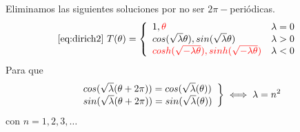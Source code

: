 \noindent Eliminamos las siguientes soluciones por no ser $2\pi-$periódicas.
\begin{equation*}
\eqref{eq:dirich2}\ T(\theta) = \left\{
\begin{array}{l l}
1,\color{red}{\theta} & \lambda=0\\
cos(\sqrt{\lambda}\theta), sin(\sqrt{\lambda}\theta) & \lambda > 0\\
\color{red}{cosh(\sqrt{-\lambda\theta})}, \color{red}{sinh(\sqrt{-\lambda\theta})} & \lambda < 0
\end{array}
\right.
\end{equation*}
Para que
\begin{equation*}
\left.
\begin{array}{l l}
cos(\sqrt{\lambda}(\theta+2\pi)) = cos(\sqrt{\lambda}(\theta))\\
sin(\sqrt{\lambda}(\theta+2\pi)) = sin(\sqrt{\lambda}(\theta))\\
\end{array}
\right\} \iff \lambda = n^2
\end{equation*}
con $n=1,2,3,\hdots$

